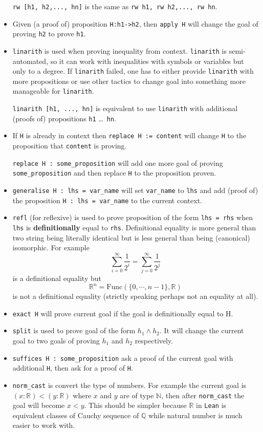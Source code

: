 \documentclass{report}
\theoremstyle{definition}
\theoremstyle{plain}
\begin{document}
\begin{itemize}
  \texttt{rw [h1, h2,..., hn]} is the same as \texttt{rw h1, rw h2,..., rw hn}.
  \item Given (a proof of) proposition \texttt{H:h1->h2}, then \texttt{apply H} will change the goal of proving \texttt{h2} to prove \texttt{h1}.
  \item \texttt{linarith} is used when proving inequality from context. \texttt{linarith} is semi-automated, so it can work with inequalities with symbols or variables but only to a degree. If \texttt{linarith} failed, one has to either provide \texttt{linarith} with more propositions or use other tactics to change goal into something more manageable for \texttt{linarith}.
  
  \texttt{linarith [h1, ..., hn]} is equivalent to use \texttt{linarith} with additional (proofs of) propositions {\tt h1} \dots {\tt { hn}}.
  \item If {\tt H} is already in context then \texttt{replace H := content} will change {\tt H} to the proposition that {\tt content} is proving. 
  
  \texttt{replace H : some_proposition} will add one more goal of proving \texttt{some_proposition} and then replace {\tt H} to the proposition proven.
  \item \texttt{generalise H : lhs = var_name} will set {\tt var\_name} to {\tt lhs} and add (proof of) the proposition \texttt{H : lhs = var_name} to the current context.
  \item {\tt refl} (for reflexive) is used to prove proposition of the form {\tt lhs = rhs} when {\tt lhs} is {\bf definitionally} equal to {\tt rhs}. Definitional equality is more general than two string being literally identical but is less general than being (canonical) isomorphic. For example
  $$
\sum_{i=0}^\infty \frac{1}{2^i}=\sum_{j=0}^\infty \frac{1}{2^j}
  $$
  is a definitional equality but
  $$
\mathbb R^n = \mathrm{Func}\left(\{0,\cdots, n-1\},\mathbb R\right)
  $$ is not a definitional equality (strictly speaking perhaps not an equality at all).
\item {\tt exact H} will prove current goal if the goal is definitionally equal to H. 
\item \texttt{split} is used to prove goal of the form $h_1 \land h_2$. It will change the current goal to two goals of proving $h_1$ and $h_2$ respectively.
\item \texttt{suffices H : some_proposition} ask a proof of the current goal with additional {\tt H}, then ask for a proof of {\tt H}.
\item \texttt{norm_cast} is convert the type of numbers. For example the current goal is $(x:\mathbb R)<(y:\mathbb R)$ where $x$ and $y$ are of type $\mathbb N$, then after \texttt{norm_cast} the goal will become $x<y$. This should be simpler because $\mathbb R$ in {\tt Lean} is equivalent classes of Cauchy sequence of $\mathbb Q$ while natural number is much easier to work with.


\end{itemize}
\end{document}
